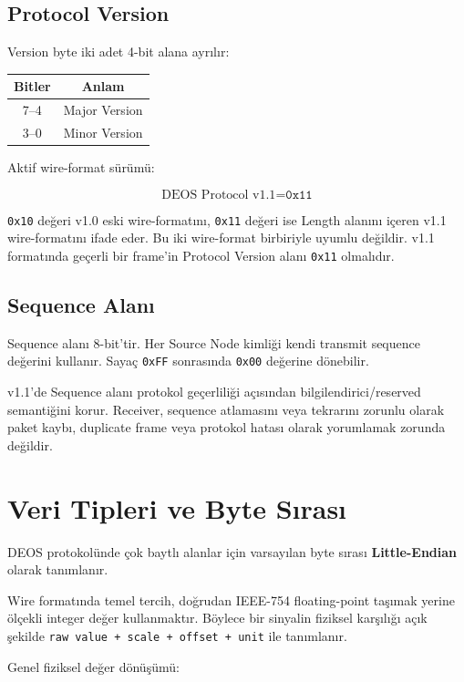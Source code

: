 \documentclass[a4paper,10pt]{article}
\newcommand{\hex}[1]{\texttt{0x#1}}
\newcommand{\code}[1]{\texttt{#1}}
\begin{document}
\subsection{Protocol Version}

Version byte iki adet 4-bit alana ayrılır:

\begin{center}
\begin{tabular}{c c}
\toprule
Bitler & Anlam \\
\midrule
7--4 & Major Version \\
3--0 & Minor Version \\
\bottomrule
\end{tabular}
\end{center}

Aktif wire-format sürümü:

\[
\text{DEOS Protocol v1.1} = \hex{11}
\]

\hex{10} değeri v1.0 eski wire-formatını, \hex{11} değeri ise Length alanını içeren v1.1
wire-formatını ifade eder. Bu iki wire-format birbiriyle uyumlu değildir. v1.1 formatında
geçerli bir frame'in Protocol Version alanı \hex{11} olmalıdır.

\subsection{Sequence Alanı}

Sequence alanı 8-bit'tir. Her Source Node kimliği kendi transmit sequence değerini kullanır.
Sayaç \hex{FF} sonrasında \hex{00} değerine dönebilir.

v1.1'de Sequence alanı protokol geçerliliği açısından bilgilendirici/reserved semantiğini
korur. Receiver, sequence atlamasını veya tekrarını zorunlu olarak paket kaybı, duplicate
frame veya protokol hatası olarak yorumlamak zorunda değildir.

\section{Veri Tipleri ve Byte Sırası}

DEOS protokolünde çok baytlı alanlar için varsayılan byte sırası \textbf{Little-Endian}
olarak tanımlanır.

Wire formatında temel tercih, doğrudan IEEE-754 floating-point taşımak yerine ölçekli
integer değer kullanmaktır. Böylece bir sinyalin fiziksel karşılığı açık şekilde
\code{raw value + scale + offset + unit} ile tanımlanır.

Genel fiziksel değer dönüşümü:
\end{document}
